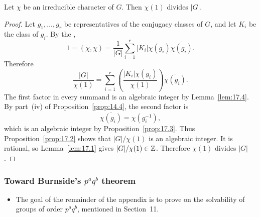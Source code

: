 \documentclass[../Odyssey_Project.tex]{subfiles}
\begin{document}
\begin{proposition}
\label{prop:17.5}
Let $\chi$ be an irreducible character of $G$. Then $\chi(1)$ divides $|G|$.
\end{proposition}
\begin{proof}
    Let $g_1,\ldots,g_r$ be representatives of the conjugacy classes of $G$, and let $K_i$ be the class of $g_i$. By the ,
    \[
        1=(\chi,\chi)
        =\frac{1}{|G|}\sum_{i=1}^{r}|K_i|\chi(g_i)\overline{\chi(g_i)}.
    \]
    Therefore
    \[
        \frac{|G|}{\chi(1)}
        =\sum_{i=1}^{r}
        \left(\frac{|K_i|\chi(g_i)}{\chi(1)}\right)
        \overline{\chi(g_i)}.
    \]
    The first factor in every summand is an algebraic integer by Lemma~\ref{lem:17.4}. By part~(iv) of Proposition~\ref{prop:14.4}, the second factor is
    \[
        \overline{\chi(g_i)}=\chi(g_i^{-1}),
    \]
    which is an algebraic integer by Proposition~\ref{prop:17.3}. Thus Proposition~\ref{prop:17.2} shows that $|G|/\chi(1)$ is an algebraic integer. It is rational, so Lemma~\ref{lem:17.1} gives $|G|/\chi(1)\in\mathbb{Z}$. Therefore $\chi(1)$ divides $|G|$.
\end{proof}

\subsubsection*{Toward Burnside's \texorpdfstring{$p^a q^b$}{p\^a q\^b} theorem}
\begin{itemize}
    \item The goal of the remainder of the appendix is to prove  on the solvability of groups of order $p^a q^b$, mentioned in Section~11.
\end{itemize}
\end{document}
